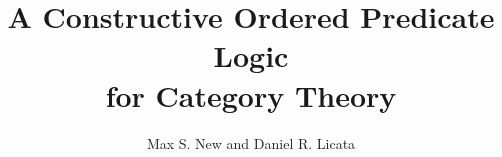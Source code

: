 \documentclass{llncs}
\begin{document}
\newcommand{\paramPresheaf}[1]{\mathcal P^{#1}}
\newcommand{\pmPresheaf}{\paramPresheaf\pm}
\newcommand{\posPresheaf}{\paramPresheaf+}
\newcommand{\negPresheaf}{\paramPresheaf-}
\newcommand{\negPresheafAppPtoX}[2]{#2\in #1}
\newcommand{\posPresheafAppPtoX}[2]{#1 \ni #2}
\newcommand{\negPresheafApp}{\negPresheafAppPtoX}
\newcommand{\posPresheafApp}{\posPresheafAppPtoX}

\newcommand{\graphProf}[3]{\sum_{{#1};{#2}} #3}

\newcommand{\algCtx}{\textrm{Ctx}}
\newcommand{\algSubst}{\textrm{Subst}}
\newcommand{\algTy}{\textrm{Type}}
\newcommand{\algTm}{\textrm{Term}}
\newcommand{\algCat}{\textrm{Cat}}
\newcommand{\algVarr}{\textrm{Functor}}
\newcommand{\algHCtx}{\textrm{ProfCtx}}
\newcommand{\algHSubst}{\textrm{ProfSubst}}
\newcommand{\algHarr}{\textrm{Prof}}
\newcommand{\algTrans}{\textrm{Trans}}
\newcommand{\algElts}{\textrm{Elts}}
\newcommand{\algEltsI}{\textrm{EltsI}}

\newcommand{\algLHom}{\textrm{LHom}}
\newcommand{\algLHomI}{\textrm{LHomI}}
\newcommand{\algLHomE}{\textrm{LHomE}}
\newcommand{\algRHom}{\textrm{RHom}}
\newcommand{\algRHomI}{\textrm{RHomI}}
\newcommand{\algRHomE}{\textrm{RHomE}}

\newcommand{\algUnit}{\textrm{Unit}}
\newcommand{\algUnitI}{\textrm{UnitI}}
\newcommand{\algUnitE}{\textrm{UnitE}}

\newcommand{\algTensor}{\textrm{Tensor}}
\newcommand{\algTensorI}{\textrm{TensorI}}
\newcommand{\algTensorE}{\textrm{TensorE}}

\newcommand{\algCatTy}{\textrm{Cat}}
\newcommand{\algCatQt}{\textrm{CatQt}}
\newcommand{\algCatUnqt}{\textrm{CatUnQt}}

\newcommand{\algTransTy}{\textrm{Trans}}
\newcommand{\algTransQt}{\textrm{TransQt}}
\newcommand{\algTransUnqt}{\textrm{TransUnQt}}

\newcommand{\algVarrQt}{\textrm{FunctQt}}
\newcommand{\algVarrUnqt}{\textrm{FunctUnQt}}

\newcommand{\quoth}[1]{\lceil{} {#1}\rceil{}}
\newcommand{\unquoth}[1]{\lfloor{} {#1}\rfloor{}}

\newcommand{\citet}[1]{\cite{#1}}
\newcommand{\citep}[1]{(\cite{#1})}

\title{A Constructive Ordered Predicate Logic \\ for Category Theory}
\author{Max S. New and Daniel R. Licata}

\maketitle
\end{document}
